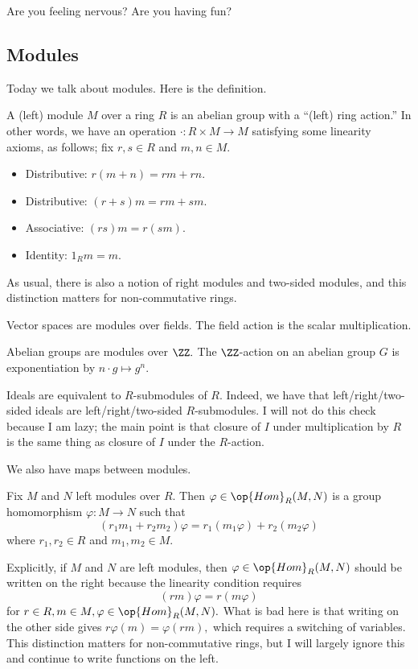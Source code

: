 













Are you feeling nervous? Are you having fun?

\subsection{Modules}
Today we talk about modules. Here is the definition.
\begin{definition}[Module]
	A (left) module $M$ over a ring $R$ is an abelian group with a ``(left) ring action.'' In other words, we have an operation $\cdot:R\times M\to M$ satisfying some linearity axioms, as follows; fix $r,s\in R$ and $m,n\in M.$
	\begin{itemize}
		\item Distributive: $r(m+n)=rm+rn.$
		\item Distributive: $(r+s)m=rm+sm.$
		\item Associative: $(rs)m=r(sm).$
		\item Identity: $1_Rm=m.$
	\end{itemize}
\end{definition}
As usual, there is also a notion of right modules and two-sided modules, and this distinction matters for non-commutative rings.
\begin{example}
	Vector spaces are modules over fields. The field action is the scalar multiplication.
\end{example}
\begin{example}
	Abelian groups are modules over $\ZZ.$ The $\ZZ$-action on an abelian group $G$ is exponentiation by $n\cdot g\mapsto g^n.$
\end{example}
\begin{example}
	Ideals are equivalent to $R$-submodules of $R.$ Indeed, we have that left/right/two-sided ideals are left/right/two-sided $R$-submodules. I will not do this check because I am lazy; the main point is that closure of $I$ under multiplication by $R$ is the same thing as closure of $I$ under the $R$-action.
\end{example}
We also have maps between modules.
\begin{definition}
	Fix $M$ and $N$ left modules over $R.$ Then $\varphi\in\op{Hom}_R(M,N)$ is a group homomorphism $\varphi:M\to N$ such that
	\[(r_1m_1+r_2m_2)\varphi=r_1(m_1\varphi)+r_2(m_2\varphi)\]
	where $r_1,r_2\in R$ and $m_1,m_2\in M.$
\end{definition}
Explicitly, if $M$ and $N$ are left modules, then $\varphi\in\op{Hom}_R(M,N)$ should be written on the right because the linearity condition requires
\[(rm)\varphi=r(m\varphi)\]
for $r\in R,m\in M,\varphi\in\op{Hom}_R(M,N).$ What is bad here is that writing on the other side gives $r\varphi(m)=\varphi(rm),$ which requires a switching of variables. This distinction matters for non-commutative rings, but I will largely ignore this and continue to write functions on the left.

